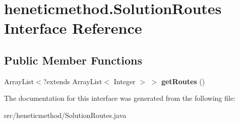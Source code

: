 \hypertarget{interfaceheneticmethod_1_1_solution_routes}{}\section{heneticmethod.\+Solution\+Routes Interface Reference}
\label{interfaceheneticmethod_1_1_solution_routes}
\subsection*{Public Member Functions}
\begin{DoxyCompactItemize}
\item 
Array\+List$<$?extends Array\+List$<$ Integer $>$ $>$ {\bfseries get\+Routes} ()\hypertarget{interfaceheneticmethod_1_1_solution_routes_a242f122058c0c289da41028f8b10cfad}{}\label{interfaceheneticmethod_1_1_solution_routes_a242f122058c0c289da41028f8b10cfad}

\end{DoxyCompactItemize}


The documentation for this interface was generated from the following file\+:\begin{DoxyCompactItemize}
\item 
src/heneticmethod/Solution\+Routes.\+java\end{DoxyCompactItemize}
